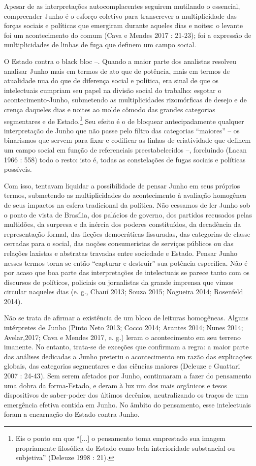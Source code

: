Apesar de as interpretações autocomplacentes seguirem mutilando o
essencial, compreender Junho é o esforço coletivo para transcrever a
multiplicidade das forças sociais e políticas que emergiram durante
aqueles dias e noites: o levante foi um acontecimento do comum (Cava e
Mendes 2017 : 21-23); foi a expressão de multiplicidades de linhas de
fuga que definem um campo social.

O Estado contra o black bloc --. Quando a maior parte dos analistas
resolveu analisar Junho mais em termos de ato que de potência, mais em
termos de atualidade nua do que de diferença social e política, era
sinal de que os intelectuais cumpriam seu papel na divisão social do
trabalho: esgotar o acontecimento-Junho, submetendo as multiplicidades
rizomórficas de desejo e de crença daqueles dias e noites ao molde
cômodo das grandes categorias segmentares e de Estado.\footnote{Eis o
  ponto em que ``{[}...{]} o pensamento toma emprestado sua imagem
  propriamente filosófica do Estado como bela interioridade substancial
  ou subjetiva'' (Deleuze 1998 : 21).} Seu efeito é o de bloquear
antecipadamente qualquer interpretação de Junho que não passe pelo
filtro das categorias ``maiores'' -- os binarismos que servem para fixar
e codificar as linhas de criatividade que definem um campo social em
função de referenciais preestabelecidos --, forcluindo (Lacan 1966 :
558) todo o resto: isto é, todas as constelações de fugas sociais e
políticas possíveis.

Com isso, tentavam liquidar a possibilidade de pensar Junho em seus
próprios termos, submetendo as multiplicidades do acontecimento à
avaliação homogênea de seus impactos na esfera tradicional da política.
Não cessamos de ler Junho sob o ponto de vista de Brasília, dos palácios
de governo, dos partidos recusados pelas multidões, da surpresa e da
inércia dos poderes constituídos, da decadência da representação formal,
das ficções democráticas fissuradas, das categorias de classe cerradas
para o social, das noções consumeristas de serviços públicos ou das
relações laxistas e abstratas travadas entre sociedade e Estado. Pensar
Junho nesses termos torna-se então ``capturar e destruir'' sua potência
específica. Não é por acaso que boa parte das interpretações de
intelectuais se parece tanto com os discursos de políticos, policiais ou
jornalistas da grande imprensa que vimos circular naqueles dias (e. g.,
Chauí 2013; Souza 2015; Nogueira 2014; Rosenfeld 2014).

Não se trata de afirmar a existência de um bloco de leituras homogêneas.
Alguns intérpretes de Junho (Pinto Neto 2013; Cocco 2014; Arantes 2014;
Nunes 2014; Avelar,2017; Cava e Mendes 2017, e. g.) leram o
acontecimento em seu terreno imanente. No entanto, trata-se de exceções
que confirmam a regra: a maior parte das análises dedicadas a Junho
preteriu o acontecimento em razão das explicações globais, das
categorias segmentares e das ciências maiores (Deleuze e Guattari 2007 :
24-43). Sem serem afetados por Junho, continuaram a fazer do pensamento
uma dobra da forma-Estado, e deram à luz um dos mais orgânicos e tesos
dispositivos de saber-poder dos últimos decênios, neutralizando os
traços de uma emergência efetiva contida em Junho. No âmbito do
pensamento, esse intelectuais foram a encarnação do Estado contra Junho.


